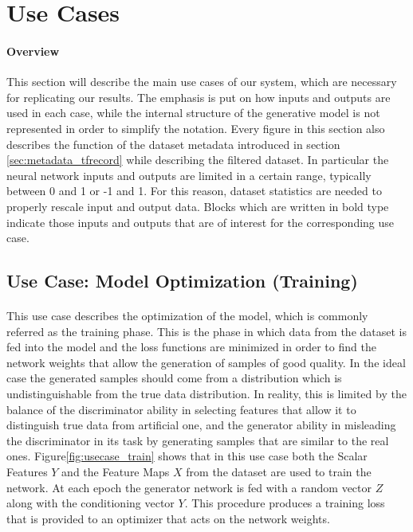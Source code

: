 \section{Use Cases}
\label{sec:usecases}
\paragraph{Overview} This section will describe the main use cases of our system, which are necessary for replicating our results. The emphasis is put on how inputs and outputs are used in each case, while the internal structure of the generative model is not represented in order to simplify the notation. Every figure in this section also describes the function of the dataset metadata introduced in section \ref{sec:metadata_tfrecord} while describing the filtered dataset. In particular the neural network inputs and outputs are limited in a certain range, typically between 0 and 1 or -1 and 1. For this reason, dataset statistics are needed to properly rescale input and output data. Blocks which are written in bold type indicate those inputs and outputs that are of interest for the corresponding use case.

\subsection{Use Case: Model Optimization (Training)}
\label{sec:usecase_train}
\paragraph{} This use case describes the optimization of the model, which is commonly referred as the training phase. This is the phase in which data from the dataset is fed into the model and the loss functions are minimized in order to find the network weights that allow the generation of samples of good quality. In the ideal case the generated samples should come from a distribution which is undistinguishable from the true data distribution. In reality, this is limited by the balance of the discriminator ability in selecting features that allow it to distinguish true data from artificial one, and the generator ability in misleading the discriminator in its task by generating samples that are similar to the real ones. Figure\ref{fig:usecase_train} shows that in this use case both the Scalar Features $Y$ and the Feature Maps $X$ from the dataset are used to train the network. At each epoch the generator network is fed with a random vector $Z$ along with the conditioning vector $Y$. This procedure produces a training loss that is provided to an optimizer that acts on the network weights. 

